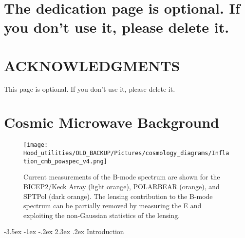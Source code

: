 \documentclass[12pt]{report}
\makeatletter
\renewcommand\section{\@startsection {section}{1}{\z@}%
                                   {-3.5ex \@plus -1ex \@minus -.2ex}%
                                   {2.3ex \@plus.2ex}%
                                   {\centering\normalfont}}
\makeatother
\begin{document}
\doublespacing
{} \setcounter{page}{2}

\chapter*{The dedication page is optional. If you don't use it, please delete it.}
\vspace{7mm}

\chapter*{ACKNOWLEDGMENTS}
\vspace{7mm}
This page is optional. If you don't use it, please delete it.
\tableofcontents

\listoftables
\newpage
\listoffigures
\newpage


\normalsize
\doublespacing
{}
\setcounter{page}{1}

\chapter{\bf{Cosmic Microwave Background}}
\vspace{-7mm}
\begin{figure}[h!]
\centering
\texttt{[image: Hood\_utilities/OLD\_BACKUP/Pictures/cosmology\_diagrams/Inflation\_cmb\_powspec\_v4.png]}   %
  \caption{Current measurements of the B-mode spectrum are shown for the BICEP2/Keck Array (light orange), POLARBEAR (orange), and SPTPol (dark orange). The lensing contribution to the B-mode spectrum can be partially removed by measuring the E and exploiting the non-Gaussian statistics of the lensing.}
  \label{fig:current B-Mode measurements}
\end{figure}


\section{Introduction}\label{Introduction}
\end{document}
